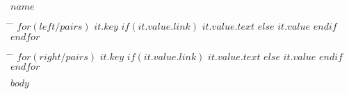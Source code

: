 \documentclass[10pt]{article}
\begin{document}
{%
\centering\huge{\textbf{\uppercase{$name$}}} \\
\hfill
}

\begin{minipage}[t]{0.5\textwidth}
	\begin{tabbing}
		\hspace{2cm} \= \hspace{4cm} \= \kill
        $for(left/pairs)$
			\textbf{$it.key$} \>
			$if(it.value.link)$
				\href{$it.value.link$}{$it.value.text$}
			$else$
				{$it.value$}
			$endif$ \\
		$endfor$
	\end{tabbing}
\end{minipage}%
\hfill
\begin{minipage}[t]{0.5\textwidth}
	\begin{tabbing}
		\hspace{2cm} \= \hspace{4cm} \= \kill
        $for(right/pairs)$
			\textbf{$it.key$} \>
			$if(it.value.link)$
				\href{$it.value.link$}{$it.value.text$}
			$else$
				{$it.value$}
			$endif$ \\
		$endfor$
	\end{tabbing}
\end{minipage}

$body$
\end{document}
